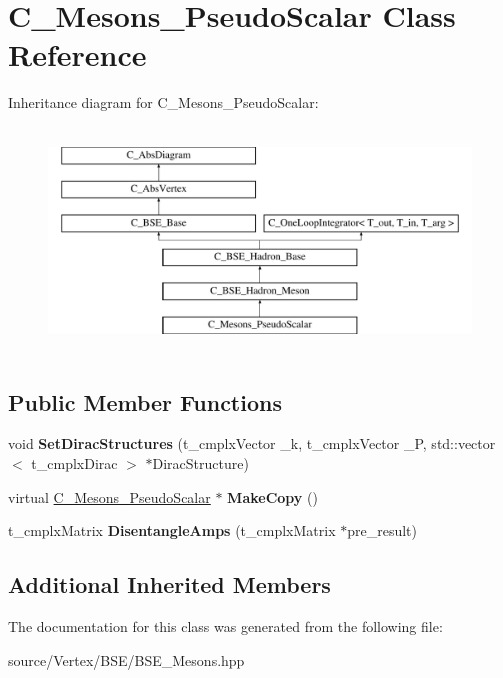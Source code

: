 \hypertarget{class_c___mesons___pseudo_scalar}{\section{C\-\_\-\-Mesons\-\_\-\-Pseudo\-Scalar Class Reference}
\label{class_c___mesons___pseudo_scalar}
}
Inheritance diagram for C\-\_\-\-Mesons\-\_\-\-Pseudo\-Scalar\-:\begin{figure}[H]
\begin{center}
\leavevmode
\includegraphics[height=6.000000cm]{class_c___mesons___pseudo_scalar}
\end{center}
\end{figure}
\subsection*{Public Member Functions}
\begin{DoxyCompactItemize}
\item 
\hypertarget{class_c___mesons___pseudo_scalar_a8b0fe6ddc33e67dc0f71877b7b62e66a}{void {\bfseries Set\-Dirac\-Structures} (t\-\_\-cmplx\-Vector \-\_\-k, t\-\_\-cmplx\-Vector \-\_\-\-P, std\-::vector$<$ t\-\_\-cmplx\-Dirac $>$ $\ast$Dirac\-Structure)}\label{class_c___mesons___pseudo_scalar_a8b0fe6ddc33e67dc0f71877b7b62e66a}

\item 
\hypertarget{class_c___mesons___pseudo_scalar_ae1915d7867f2a24a8c8ae4a8a9b1b020}{virtual \hyperlink{class_c___mesons___pseudo_scalar}{C\-\_\-\-Mesons\-\_\-\-Pseudo\-Scalar} $\ast$ {\bfseries Make\-Copy} ()}\label{class_c___mesons___pseudo_scalar_ae1915d7867f2a24a8c8ae4a8a9b1b020}

\item 
\hypertarget{class_c___mesons___pseudo_scalar_ad18d40271977cd2160250f6ef6a30a30}{t\-\_\-cmplx\-Matrix {\bfseries Disentangle\-Amps} (t\-\_\-cmplx\-Matrix $\ast$pre\-\_\-result)}\label{class_c___mesons___pseudo_scalar_ad18d40271977cd2160250f6ef6a30a30}

\end{DoxyCompactItemize}
\subsection*{Additional Inherited Members}


The documentation for this class was generated from the following file\-:\begin{DoxyCompactItemize}
\item 
source/\-Vertex/\-B\-S\-E/B\-S\-E\-\_\-\-Mesons.\-hpp\end{DoxyCompactItemize}
